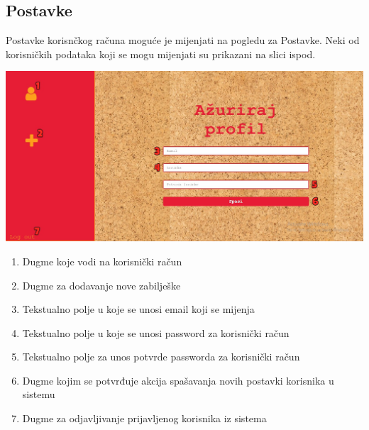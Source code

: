 \newpage


\subsection{Postavke}
Postavke korisnčkog računa moguće je mijenjati na pogledu za Postavke. Neki od korisničkih podataka koji se mogu mijenjati su prikazani na slici ispod.


\centerline{\includegraphics[scale=0.5]{slike/postavke_np.jpg}}
\begin{enumerate}
    \item Dugme koje vodi na korisnički račun
    \item Dugme za dodavanje nove zabilješke
    \item Tekstualno polje u koje se unosi email koji se mijenja
    \item Tekstualno polje u koje se unosi password za korisnički račun
    \item Tekstualno polje za unos potvrde passworda za korisnički račun
    \item Dugme kojim se potvrđuje akcija spašavanja novih postavki korisnika u sistemu
    \item Dugme za odjavljivanje prijavljenog korisnika iz sistema
\end{enumerate}



